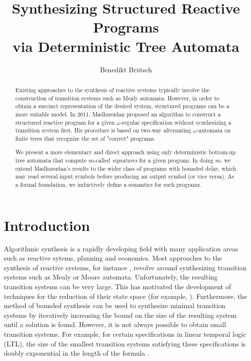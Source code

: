 \documentclass[submission,copyright,creativecommons]{eptcs}
\title{Synthesizing Structured Reactive Programs \\ via Deterministic Tree Automata}
\author{Benedikt Brütsch
	\institute{RWTH Aachen University, Lehrstuhl für Informatik 7, Germany}
	\email{bruetsch@automata.rwth-aachen.de}
}
\newcommand{\ignore}[1]{}
\begin{document}
\maketitle


\begin{abstract}
Existing approaches to the synthesis of reactive systems typically involve the
construction of transition systems such as Mealy automata.
However, in order to obtain a succinct representation of the desired system,
structured programs can be a more suitable model.
In 2011, Madhusudan proposed an algorithm to construct a structured
reactive program for a given $\omega$-regular specification without
synthesizing a transition system first.
His procedure is based on two-way alternating $\omega$-automata on finite
trees that recognize the set of "correct" programs.

We present a more elementary and direct approach using only deterministic
bottom-up tree automata that compute so-called \emph{signatures}
for a given program.
In doing so, we extend Madhusudan's results to the wider class
of programs with bounded delay, which may read several input symbols before
producing an output symbol (or vice versa).
As a formal foundation, we inductively define a semantics for such programs.
\end{abstract}

\vspace{2mm}
\section{Introduction}

Algorithmic synthesis is a rapidly developing field with many application
areas such as reactive sytems, planning and economics.
Most approaches to the synthesis of reactive systems, for instance
\cite{buchi_solving_1969,Rabin:1972:AIO:540412,DBLP:conf/popl/PnueliR89,kupferman_churchs_1999},
revolve around synthesizing transition systems such as Mealy or Moore
automata.
Unfortunately, the resulting transition systems can be very large.
This has motivated the development of techniques for the reduction of their
state space (for example, \cite{DBLP:journals/corr/abs-1102-4120}).
Furthermore, the method of bounded synthesis
\cite{schewe_bounded_2007,ehlers_symbolic_2010} can be used to synthesize
minimal transition systems by iteratively increasing the bound on the size
of the resulting system until a solution is found.\ignore{TODO: Is this an appropriate description?}
However, it is not always possible to obtain small transition systems.
For example, for certain specifications in linear temporal logic
(LTL), the size of the smallest transition systems satisfying these
specifications is doubly exponential in the length of the formula
\cite{rosner}.
\end{document}
